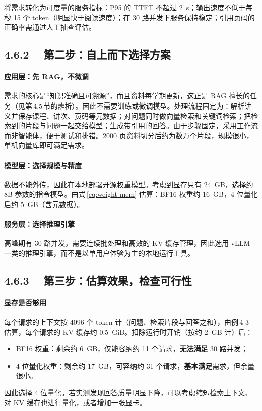 \documentclass{article}
\begin{document}
将需求转化为可度量的服务指标：P95 的 TTFT 不超过 \SI{2}{s}；输出速度不低于每秒 15 个 token（明显快于阅读速度）；在 30 路并发下服务保持稳定；引用页码的正确率需通过人工抽查评估。

\subsection*{4.6.2　 第二步：自上而下选择方案}

\paragraph{应用层：先 RAG，不微调} 需求的核心是“知识准确且可溯源”，而且资料每学期更新，这正是 RAG 擅长的任务（见第\,4.5\,节的辨析）。因此不需要训练或微调模型。处理流程固定为：解析讲义并保存课程、讲次、页码等元数据；对问题同时做向量检索和关键词检索；把检索到的片段与问题一起交给模型；生成带引用的回答。由于步骤固定，采用工作流而非智能体，便于测试和排错。2000 页资料切分后约为数万个片段，规模很小，单机向量库即可满足需求。

\paragraph{模型层：选择规模与精度} 数据不能外传，因此在本地部署开源权重模型。考虑到显存只有 \SI{24}{GB}，选择约 8B 参数的指令模型。由式\,\eqref{eq:weight-mem} 估算：BF16 权重约 \SI{16}{GB}，4 位量化后约 \SI{5}{GB}（含元数据）。

\paragraph{服务层：选择推理引擎} 高峰期有 30 路并发，需要连续批处理和高效的 KV 缓存管理，因此选用 vLLM 一类的推理引擎，而不是以单用户体验为主的本地运行工具。

\subsection*{4.6.3　 第三步：估算效果，检查可行性}

\paragraph{显存是否够用} 每个请求的上下文按 4096 个 token 计（问题、检索片段与回答之和），由例\,4-3 估算，每个请求的 KV 缓存约 \SI{0.5}{GiB}。扣除运行时开销（按约 \SI{2}{GB} 计）后：
\begin{itemize}
  \item BF16 权重：剩余约 \SI{6}{GB}，仅能容纳约 11 个请求，\textbf{无法满足} 30 路并发；
  \item 4 位量化权重：剩余约 \SI{17}{GB}，可容纳约 31 个请求，\textbf{基本满足}需求，但余量很小。
\end{itemize}
因此选择 4 位量化。若实测发现回答质量明显下降，可以考虑缩短检索上下文、对 KV 缓存也进行量化，或者增加一张显卡。
\end{document}
